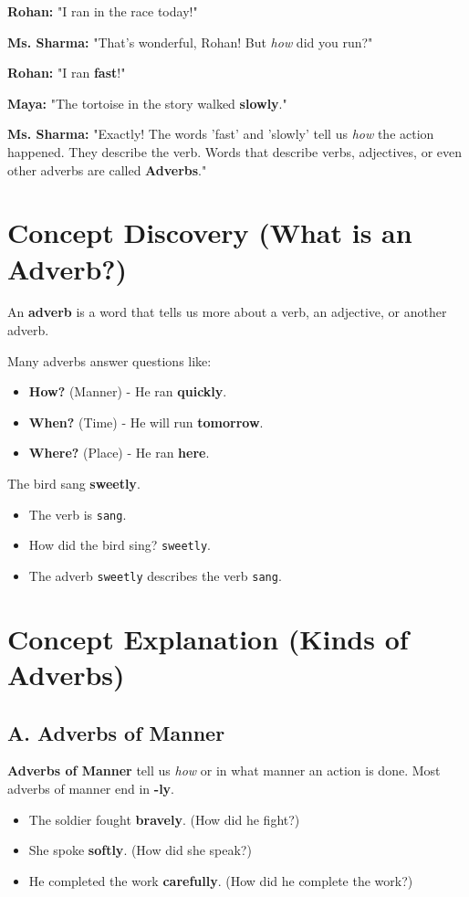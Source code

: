 \textbf{Rohan:} "I ran in the race today!"

\textbf{Ms. Sharma:} "That's wonderful, Rohan! But \textit{how} did you run?"

\textbf{Rohan:} "I ran \textbf{fast}!"

\textbf{Maya:} "The tortoise in the story walked \textbf{slowly}."

\textbf{Ms. Sharma:} "Exactly! The words 'fast' and 'slowly' tell us \textit{how} the action happened. They describe the verb. Words that describe verbs, adjectives, or even other adverbs are called \textbf{Adverbs}."

\section{Concept Discovery (What is an Adverb?)}
An \textbf{adverb} is a word that tells us more about a verb, an adjective, or another adverb.

Many adverbs answer questions like:
\begin{itemize}
    \item \textbf{How?} (Manner) - He ran \textbf{quickly}.
    \item \textbf{When?} (Time) - He will run \textbf{tomorrow}.
    \item \textbf{Where?} (Place) - He ran \textbf{here}.
\end{itemize}

\begin{examplebox}
The bird sang \textbf{sweetly}.
\begin{itemize}
    \item The verb is \texttt{sang}.
    \item How did the bird sing? \texttt{sweetly}.
    \item The adverb \texttt{sweetly} describes the verb \texttt{sang}.
\end{itemize}
\end{examplebox}

\section{Concept Explanation (Kinds of Adverbs)}

\subsection*{A. Adverbs of Manner}
\textbf{Adverbs of Manner} tell us \textit{how} or in what manner an action is done. Most adverbs of manner end in \textbf{-ly}.
\begin{itemize}
    \item The soldier fought \textbf{bravely}. (How did he fight?)
    \item She spoke \textbf{softly}. (How did she speak?)
    \item He completed the work \textbf{carefully}. (How did he complete the work?)
\end{itemize}

